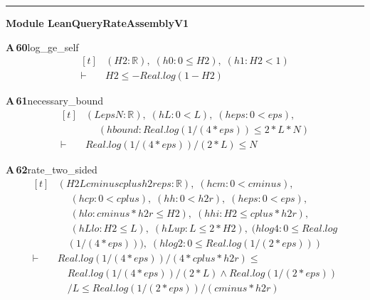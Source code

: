 \documentclass[conference]{IEEEtran}
\theoremstyle{definition}
\newcommand{\lean}[1]{\textsf{\footnotesize #1}}
\begin{document}
\vspace{4pt}\noindent\rule{\columnwidth}{0.4pt}\par\vspace{2pt}
\noindent\textbf{Module \lean{LeanQueryRateAssemblyV1}}\par\vspace{3pt}

\noindent\textbf{A\,60}\quad\lean{log\_ge\_self}
{\footnotesize\[ \begin{aligned}[t]
&(\mathit{H2} : \mathbb{R} ),\; (\mathit{h0} : 0 \leq \mathit{H2}),\; (\mathit{h1} : \mathit{H2} < 1)\\
\vdash\;&\mathit{H2} \leq -\mathit{Real}.\mathit{log} (1 - \mathit{H2})
\end{aligned} \]}

\noindent\textbf{A\,61}\quad\lean{necessary\_bound}
{\footnotesize\[ \begin{aligned}[t]
&(\mathit{L} \mathit{eps} \mathit{N} : \mathbb{R} ),\; (\mathit{hL} : 0 < \mathit{L}),\; (\mathit{heps} : 0 < \mathit{eps}),\\
&\quad \; (\mathit{hbound} : \mathit{Real}.\mathit{log} (1/(4*\mathit{eps})) \leq 2*\mathit{L}*\mathit{N})\\
\vdash\;&\mathit{Real}.\mathit{log} (1/(4*\mathit{eps}))/(2*\mathit{L}) \leq \mathit{N}
\end{aligned} \]}

\noindent\textbf{A\,62}\quad\lean{rate\_two\_sided}
{\footnotesize\[ \begin{aligned}[t]
&(\mathit{H2} \mathit{L} \mathit{cminus} \mathit{cplus} \mathit{h2r} \mathit{eps} : \mathbb{R} ),\; (\mathit{hcm} : 0 < \mathit{cminus}),\\
&\quad \; (\mathit{hcp} : 0 < \mathit{cplus}),\; (\mathit{hh} : 0 < \mathit{h2r}),\; (\mathit{heps} : 0 < \mathit{eps}),\\
&\quad \; (\mathit{hlo} : \mathit{cminus} * \mathit{h2r} \leq \mathit{H2}),\; (\mathit{hhi} : \mathit{H2} \leq \mathit{cplus} * \mathit{h2r}),\\
&\quad \; (\mathit{hLlo} : \mathit{H2} \leq \mathit{L}),\; (\mathit{hLup} : \mathit{L} \leq 2*\mathit{H2}),\; (\mathit{hlog4} : 0 \leq \mathit{Real}.\mathit{log}\\
&\quad (1/(4*\mathit{eps}))),\; (\mathit{hlog2} : 0 \leq \mathit{Real}.\mathit{log} (1/(2*\mathit{eps})))\\
\vdash\;&\mathit{Real}.\mathit{log} (1/(4*\mathit{eps}))/(4*\mathit{cplus}*\mathit{h2r}) \leq\\
&\quad \mathit{Real}.\mathit{log} (1/(4*\mathit{eps}))/(2*\mathit{L}) \wedge \mathit{Real}.\mathit{log} (1/(2*\mathit{eps}))\\
&\quad /\mathit{L} \leq \mathit{Real}.\mathit{log} (1/(2*\mathit{eps}))/(\mathit{cminus}*\mathit{h2r})
\end{aligned} \]}
\end{document}
